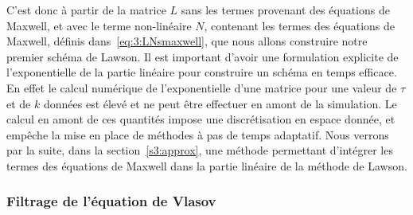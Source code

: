 C'est donc à partir de la matrice $L$ sans les termes provenant des équations de Maxwell, et avec le terme non-linéaire $N$, contenant les termes des équations de Maxwell, définis dans~\eqref{eq:3:LNsmaxwell}, que nous allons construire notre premier schéma de Lawson. Il est important d'avoir une formulation explicite de l'exponentielle de la partie linéaire pour construire un schéma en temps efficace. En effet le calcul numérique de l'exponentielle d'une matrice pour une valeur de $\tau$ et de $k$ données est élevé et ne peut être effectuer en amont de la simulation. Le calcul en amont de ces quantités impose une discrétisation en espace donnée, et empêche la mise en place de méthodes à pas de temps adaptatif. Nous verrons par la suite, dans la section~\ref{s3:approx}, une méthode permettant d'intégrer les termes des équations de Maxwell dans la partie linéaire de la méthode de Lawson.

\subsubsection{Filtrage de l'équation de Vlasov}

